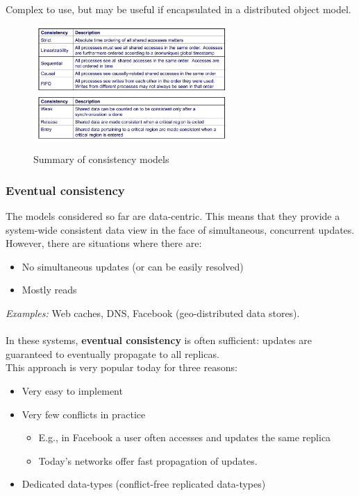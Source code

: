 \documentclass[10pt,a4paper]{article}
\begin{document}
Complex to use, but may be useful if encapsulated in a distributed object model. 
\begin{figure}[h!]
 \hfill \includegraphics[width=210pt]{images/summary-consistency.png}\hspace*{\fill}
  \label{fig:summary-consistency}
  \caption{Summary of consistency models}
\end{figure}
\subsubsection{Eventual consistency}
The models considered so far are data-centric. This means that they provide a system-wide consistent data view in the face of simultaneous, concurrent updates. However, there are situations where there are:
\begin{itemize}
	\item No simultaneous updates (or can be easily resolved)
	\item Mostly reads
\end{itemize}
\textit{Examples:} Web caches, DNS, Facebook (geo-distributed data stores). \\ \\
In these systems, \textbf{eventual consistency} is often sufficient: updates are guaranteed to eventually propagate to all replicas. \\
This approach is very popular today for three reasons:
\begin{itemize}
	\item Very easy to implement
	\item Very few conflicts in practice
	\begin{itemize}
		\item E.g., in Facebook a user often accesses and updates the same replica
		\item Today's networks offer fast propagation of updates.
	\end{itemize}	  
	\item Dedicated data-types (conflict-free replicated data-types)
\end{itemize}
\end{document}
